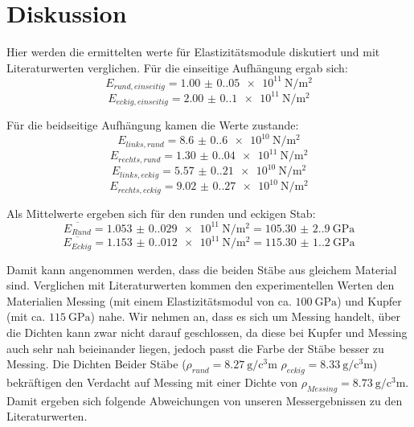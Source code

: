 \section{Diskussion}
\label{sec:Diskussion}
Hier werden die ermittelten werte für Elastizitätsmodule diskutiert und mit Literaturwerten verglichen.
Für die einseitige Aufhängung ergab sich:
\begin{equation*}
    E_{rund,einseitig} = \qty{1.00(0.05)e11}{\newton\per\meter\squared}
  \end{equation*}
\begin{equation*}
    E_{eckig,einseitig} = \qty{2.00(0.1)e11}{\newton\per\meter\squared}
\end{equation*}

Für die beidseitige Aufhängung kamen die Werte zustande:
\begin{equation*}
    E_{links,rund} = \qty{8.6(0.6)e10}{\newton\per\meter\squared}
  \end{equation*}
\begin{equation*}
    E_{rechts,rund} = \qty{1.30(0.04)e11}{\newton\per\meter\squared}
\end{equation*}
\begin{equation*}
    E_{links,eckig} = \qty{5.57(0.21)e10}{\newton\per\meter\squared}
\end{equation*}
\begin{equation*}
    E_{rechts,eckig} = \qty{9.02(0.27)e10}{\newton\per\meter\squared}
\end{equation*}

Als Mittelwerte ergeben sich für den runden und eckigen Stab:
\begin{equation*}
    \overline{E_{Rund}} = \qty{1.053(0.029)e11}{\newton\per\meter\squared} = \qty{105.30(2.90)}{\giga\pascal}
\end{equation*}
\begin{equation*}
    \overline{E_{Eckig}} = \qty{1.153(0.012)e11}{\newton\per\meter\squared} = \qty{115.30(1.20)}{\giga\pascal}
\end{equation*}

\noindent Damit kann angenommen werden, dass die beiden Stäbe aus gleichem Material sind. 
Verglichen mit Literaturwerten kommen den experimentellen Werten den Materialien
Messing (mit einem Elastizitätsmodul von ca. $\qty{100}{\giga\pascal}$) und 
Kupfer (mit ca. $\qty{115}{\giga\pascal}$) nahe. Wir 
nehmen an, dass es sich um Messing handelt, über die Dichten kann zwar nicht darauf geschlossen, 
da diese bei Kupfer und Messing auch sehr nah beieinander liegen, jedoch passt die Farbe der Stäbe 
besser zu Messing. Die Dichten Beider Stäbe ($\rho_{rund} = \qty{8.27}{\gram\per\cubic\centi\meter}$
$\rho_{eckig} = \qty{8.33}{\gram\per\cubic\centi\meter}$) bekräftigen den Verdacht auf Messing mit 
einer Dichte von $\rho_{Messing} = \qty{8.73}{\gram\per\cubic\centi\meter}$. Damit ergeben sich folgende 
Abweichungen von unseren Messergebnissen zu den Literaturwerten.

